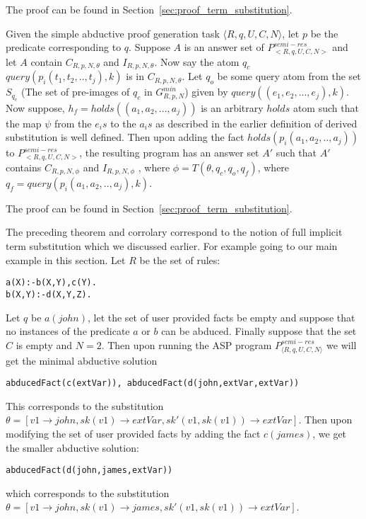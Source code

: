 The proof can be found in Section~\ref{sec:proof_term_substitution}.


%


\begin{corollary}\label{thm:addfact}
Given the simple abductive proof generation task $\langle R,q,U,C,N\rangle$, let $p$ be the predicate corresponding to $q$. Suppose $A$ is an answer set of $P^{semi-res}_{<R,q,U,C,N>}$ and let $A$ contain $C_{R,p,N,\theta}$ and $I_{R,p,N,\theta}$. Now say the atom $q_{c}$ $query(p_{i}(t_{1},t_{2},..,t_{j}),k)$ is in $C_{R,p,N,\theta}$. Let $q_{o}$ be some query atom from the set $S_{q_{c}}$ (The set of pre-images of $q_{c}$ in $G_{R,p,N}^{min}$) given by $query((e_{1},e_{2},...,e_{j}),k)$. Now suppose, $h_{f}= holds((a_{1},a_{2},...,a_{j}))$ is an arbitrary $holds$ atom such that the map $\psi$ from the $e_{i}s$ to the $a_{i}s$ as described in the earlier definition of derived substitution is well defined. Then upon adding the fact $holds(p_{i}(a_{1},a_{2},..,a_{j}))$ to $P^{semi-res}_{<R,q,U,C,N>}$, the resulting program has an answer set $A'$ such that $A'$ contains $C_{R,p,N,\phi}$ and $I_{R,p,N,\phi}$ , where $\phi = T(\theta, q_{c}, q_{o}, q_{f})$, where $q_{f} = query(p_{i}(a_{1},a_{2},..,a_{j}),k)$. 
\end{corollary}

The proof can be found in Section~\ref{sec:proof_term_substitution}.



The preceding theorem and corrolary correspond to the notion of full implicit term substitution which we discussed earlier. For example going to our main example in this section. Let $R$ be the set of rules:\begin{lstlisting}[frame=none]
a(X):-b(X,Y),c(Y).
b(X,Y):-d(X,Y,Z).
\end{lstlisting}

Let $q$ be $a(john)$, let the set of user provided facts be empty and suppose that no instances of the predicate $a$ or $b$ can be abduced. Finally suppose that the set $C$ is empty and $N=2$. Then upon running the ASP program $P_{\langle R,q,U,C,N\rangle}^{semi-res}$ we will get the minimal abductive solution \begin{lstlisting}[frame=none]
abducedFact(c(extVar)), abducedFact(d(john,extVar,extVar))
\end{lstlisting} 
This corresponds to the substitution $\theta =[v1\rightarrow john,sk(v1) \rightarrow extVar, sk'(v1,sk(v1))\rightarrow extVar]$. Then upon modifying the set of user provided facts by adding the fact $c(james)$, we get the smaller abductive solution:
\begin{lstlisting}[frame=none]
abducedFact(d(john,james,extVar))
\end{lstlisting} which corresponds to the substitution $\theta =[v1\rightarrow john,sk(v1) \rightarrow james, sk'(v1,sk(v1))\rightarrow extVar]$. 

